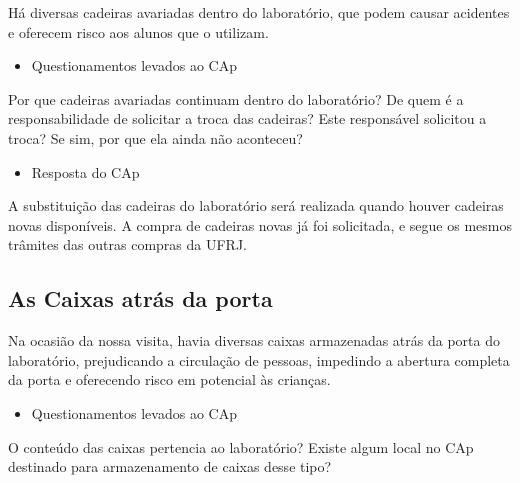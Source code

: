 Há diversas cadeiras avariadas dentro do laboratório, que podem causar acidentes e oferecem risco aos alunos que o utilizam.

\begin{itemize}
    \item Questionamentos levados ao CAp
\end{itemize}

Por que cadeiras avariadas continuam dentro do laboratório? De quem é a responsabilidade de solicitar a troca das cadeiras? Este responsável solicitou a troca? Se sim, por que ela ainda não aconteceu?

\begin{itemize}
    \item Resposta do CAp
\end{itemize}

A substituição das cadeiras do laboratório será realizada quando houver cadeiras novas disponíveis. A compra de cadeiras novas já foi solicitada, e segue os mesmos trâmites das outras compras da UFRJ.

\subsection{As Caixas atrás da porta}\label{sec:LABEL_CHP_REL_SEC_PROBS_SUBSEC_CAIX}

Na ocasião da nossa visita, havia diversas caixas armazenadas atrás da porta do laboratório, prejudicando a circulação de pessoas, impedindo a abertura completa da porta e oferecendo risco em potencial às crianças.

\begin{itemize}
    \item Questionamentos levados ao CAp
\end{itemize}

O conteúdo das caixas pertencia ao laboratório? Existe algum local no CAp destinado para armazenamento de caixas desse tipo?

